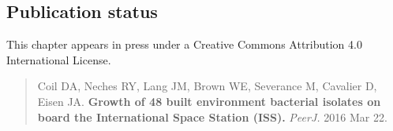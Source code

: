 \begin{refsection}
\section{Publication status}

This chapter appears in press under a Creative Commons Attribution 4.0
International License.

\begin{quote}
Coil DA, Neches RY, Lang JM, Brown WE, Severance M, Cavalier D, Eisen
JA. {\bf Growth of 48 built environment bacterial isolates on board the International Space Station (ISS).} {\em PeerJ.} 2016 Mar 22.
\end{quote}






\printbibliography[heading=subbibliography]

\end{refsection}
